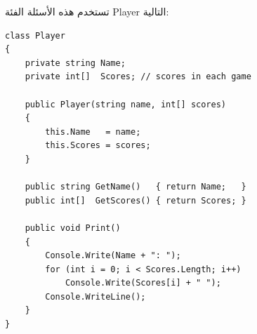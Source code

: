 \documentclass[14pt]{extarticle}
\begin{document}
تستخدم هذه الأسئلة الفئة \textenglish{Player} التالية:

\begin{boxExample}
\begin{english}
{\small
\begin{verbatim}
class Player
{
    private string Name;
    private int[]  Scores; // scores in each game

    public Player(string name, int[] scores)
    {
        this.Name   = name;
        this.Scores = scores;
    }

    public string GetName()   { return Name;   }
    public int[]  GetScores() { return Scores; }

    public void Print()
    {
        Console.Write(Name + ": ");
        for (int i = 0; i < Scores.Length; i++)
            Console.Write(Scores[i] + " ");
        Console.WriteLine();
    }
}
\end{verbatim}
}
\end{english}
\end{boxExample}
\end{document}
